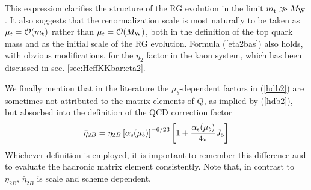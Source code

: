 This expression clarifies the structure of the RG evolution in the
limit $m_{\rm t}\gg M_{\rm W}$. It also suggests that the 
renormalization scale is most naturally to be taken as
$\mu_t={\cal O}(m_{\rm t})$ rather than $\mu_t={\cal O}(M_{\rm W})$,
both in the definition of the top quark mass and as the initial
scale of the RG evolution. Formula (\ref{eta2bas}) also holds,
with obvious modifications, for the $\eta_2$ factor in the
kaon system, which has been discussed in sec. \ref{sec:HeffKKbar:eta2}.

We finally mention that in the literature the $\mu_b$-dependent
factors in (\ref{hdb2}) are sometimes not attributed to the
matrix elements of $Q$, as implied by (\ref{hdb2}), but absorbed
into the definition of the QCD correction factor
\begin{equation}\label{e2bbar}
\bar\eta_{2B}=\eta_{2B} \left[\alpha_{\rm s}(\mu_b)\right]^{-6/23}\left[
  1 + \frac{\alpha_{\rm s}(\mu_b)}{4\pi} J_5\right]
\end{equation}
Whichever definition is employed, it is important to remember this
difference and to evaluate the hadronic matrix element consistently.
Note that, in contrast to $\eta_{2B}$, $\bar\eta_{2B}$ is scale
and scheme dependent.

